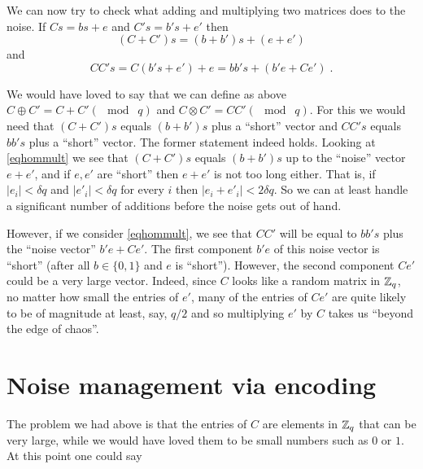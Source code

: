 We can now try to check what adding and multiplying two matrices does to
the noise. If \(Cs = bs+e\) and \(C's=b's+e'\) then
\[(C+C')s = (b+b')s+(e+e') \label{eqhomadd}\] and
\[\ensuremath{\mathit{CC}}'s = C(b's+e')+e =bb's+ (b'e+Ce')\;. \label{eqhommult} \]


We would have loved to say that we can define as above
\(C\oplus C' = C+C' (\mod\; q)\) and
\(C\otimes C' = \ensuremath{\mathit{CC}}' (\mod \; q)\). For this we
would need that \((C+C')s\) equals \((b+b')s\) plus a ``short'' vector
and \(\ensuremath{\mathit{CC}}'s\) equals \(bb's\) plus a ``short''
vector. The former statement indeed holds. Looking at \eqref{eqhommult}
we see that \((C+C')s\) equals \((b+b')s\) up to the ``noise'' vector
\(e+e'\), and if \(e,e'\) are ``short'' then \(e+e'\) is not too long
either. That is, if \(|e_i|<\delta q\) and \(|e'_i|<\delta q\) for every
\(i\) then \(|e_i+e'_i|<2\delta q\). So we can at least handle a
significant number of additions before the noise gets out of hand.

However, if we consider \eqref{eqhommult}, we see that
\(\ensuremath{\mathit{CC}}'\) will be equal to \(bb's\) plus the ``noise
vector'' \(b'e + Ce'\). The first component \(b'e\) of this noise vector
is ``short'' (after all \(b\in \{0,1\}\) and \(e\) is ``short'').
However, the second component \(Ce'\) could be a very large vector.
Indeed, since \(C\) looks like a random matrix in \({\mathbb{Z}}_q\), no matter
how small the entries of \(e'\), many of the entries of \(Ce'\) are
quite likely to be of magnitude at least, say, \(q/2\) and so
multiplying \(e'\) by \(C\) takes us ``beyond the edge of chaos''.

\section{Noise management via encoding}\label{17-Noise-management-via-e}

The problem we had above is that the entries of \(C\) are elements in
\({\mathbb{Z}}_q\) that can be very large, while we would have loved them to be
small numbers such as \(0\) or \(1\). At this point one could say

